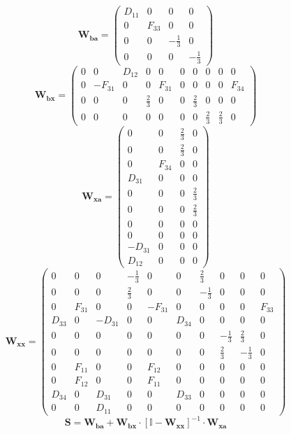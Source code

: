 \[ \mathbf{W_{ba}} = \left(\begin{smallmatrix} D_{11} & 0 & 0 & 0 \\ 0 & F_{33} & 0 & 0 \\ 0 & 0 & -\frac{1}{3} & 0 \\ 0 & 0 & 0 & -\frac{1}{3} \end{smallmatrix}\right) \]
\[ \mathbf{W_{bx}} = \left(\begin{smallmatrix} 0 & 0 & D_{12} & 0 & 0 & 0 & 0 & 0 & 0 & 0 \\ 0 & -F_{31} & 0 & 0 & F_{31} & 0 & 0 & 0 & 0 & F_{34} \\ 0 & 0 & 0 & \frac{2}{3} & 0 & 0 & \frac{2}{3} & 0 & 0 & 0 \\ 0 & 0 & 0 & 0 & 0 & 0 & 0 & \frac{2}{3} & \frac{2}{3} & 0 \end{smallmatrix}\right) \]
\[ \mathbf{W_{xa}} = \left(\begin{smallmatrix} 0 & 0 & \frac{2}{3} & 0 \\ 0 & 0 & \frac{2}{3} & 0 \\ 0 & F_{34} & 0 & 0 \\ D_{31} & 0 & 0 & 0 \\ 0 & 0 & 0 & \frac{2}{3} \\ 0 & 0 & 0 & \frac{2}{3} \\ 0 & 0 & 0 & 0 \\ 0 & 0 & 0 & 0 \\ -D_{31} & 0 & 0 & 0 \\ D_{12} & 0 & 0 & 0 \end{smallmatrix}\right) \]
\[ \mathbf{W_{xx}} = \left(\begin{smallmatrix} 0 & 0 & 0 & -\frac{1}{3} & 0 & 0 & \frac{2}{3} & 0 & 0 & 0 \\ 0 & 0 & 0 & \frac{2}{3} & 0 & 0 & -\frac{1}{3} & 0 & 0 & 0 \\ 0 & F_{31} & 0 & 0 & -F_{31} & 0 & 0 & 0 & 0 & F_{33} \\ D_{33} & 0 & -D_{31} & 0 & 0 & D_{34} & 0 & 0 & 0 & 0 \\ 0 & 0 & 0 & 0 & 0 & 0 & 0 & -\frac{1}{3} & \frac{2}{3} & 0 \\ 0 & 0 & 0 & 0 & 0 & 0 & 0 & \frac{2}{3} & -\frac{1}{3} & 0 \\ 0 & F_{11} & 0 & 0 & F_{12} & 0 & 0 & 0 & 0 & 0 \\ 0 & F_{12} & 0 & 0 & F_{11} & 0 & 0 & 0 & 0 & 0 \\ D_{34} & 0 & D_{31} & 0 & 0 & D_{33} & 0 & 0 & 0 & 0 \\ 0 & 0 & D_{11} & 0 & 0 & 0 & 0 & 0 & 0 & 0 \end{smallmatrix}\right) \]
\[ \mathbf{S}=\mathbf{W_{ba}}+\mathbf{W_{bx}}\cdot\left[ \mathbb{I}  -\mathbf{W_{xx}}\right]^{-1}\cdot\mathbf{W_{xa}} \]
